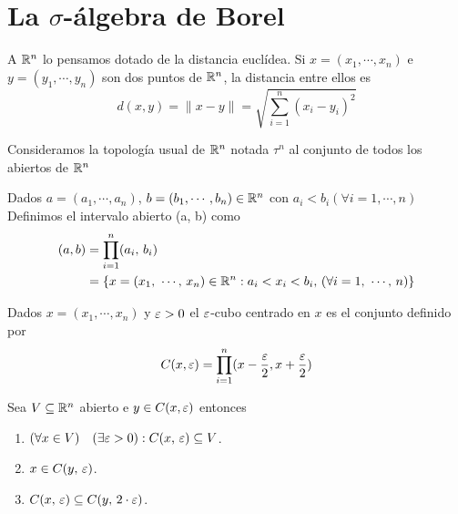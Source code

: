 \section{La $\sigma$-álgebra de Borel}
\label{sec:borel}

A $\mathbb{R}^n$ lo pensamos dotado de la distancia euclídea.
Si $x = (x_1, \cdots, x_n)$ e $y = (y_1, \cdots, y_n)$ son dos puntos de $\mathbb{R}^n$, la distancia
entre ellos es
\begin{equation*}
    d(x, y) = \|x-y\| = \sqrt{ \sum_{i=1}^n (x_i - y_i)^2 }
\end{equation*}

Consideramos la topología usual de $\mathbb{R}^n$ notada $\tau^n$ al conjunto de todos los abiertos de $\mathbb{R}^n$

\begin{definition}
    Dados $a = (a_1, \cdots, a_n)$, $b = (b_1, \cdots, b_n) \in \mathbb{R}^n$ con $a_i < b_i (\forall i = 1, \cdots, n)$
    Definimos el intervalo abierto (a, b) como
    \begin{align*}
        (a, b) & = \prod_{i=1}^n (a_i\text{, } b_i)                                                                                                \\
               & = \{ x = (x_1\text{, } \cdots \text{, } x_n) \in \mathbb{R}^n : a_i < x_i < b_i \text{, } (\forall i = 1 \text{, } \cdots \text{, } n) \}
    \end{align*}
\end{definition}

\begin{definition}[$\e$-cubo]
    Dados $x= (x_1, \cdots, x_n)$ y $\varepsilon > 0$ el $\e$-cubo centrado en $x$ es el conjunto definido por
    \begin{equation*}
        C(x, \varepsilon) = \prod_{i = 1}^n (x - \frac{\varepsilon}{2}, x + \frac{\varepsilon}{2})
    \end{equation*}
\end{definition}

\begin{prop}
    Sea $V \subseteq \mathbb{R}^n$ abierto e $y \in C(x, \varepsilon)$ entonces
    \begin{enumerate}
        \item $(\forall x \in V) \quad (\exists \varepsilon > 0) : C(x \text{, } \varepsilon) \subseteq V$.
        \item $x \in C(y\text{, } \varepsilon)$.
        \item $C(x\text{, } \varepsilon) \subseteq C(y\text{, } 2 \cdot \varepsilon)$.
    \end{enumerate}
\end{prop}

